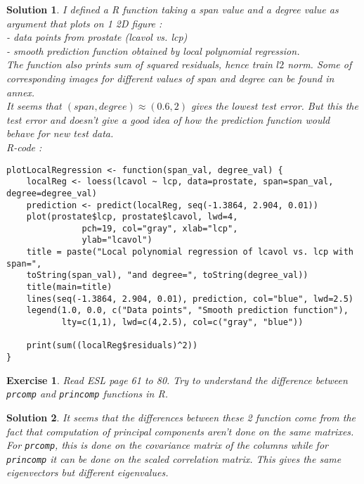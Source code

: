\documentclass[12pt,a4paper]{article}
\newtheorem{exercise}{Exercise}
\newtheorem{solution}{Solution}
\begin{document}
\begin{solution}
I defined a R function taking a span value and a degree value as argument that plots on 1 2D figure : \\
- data points from prostate (lcavol vs. lcp)\\
- smooth prediction function obtained by local polynomial regression. \\

The function also prints sum of squared residuals, hence train $l2$ norm. Some of corresponding images for different values of span and degree can be found in annex. \\

It seems that $(span, degree) \approx (0.6, 2)$ gives the lowest test error. But this the test error and doesn't give a good idea of how the prediction function would behave for new test data. \\
R-code : 
\begin{verbatim}
plotLocalRegression <- function(span_val, degree_val) {
    localReg <- loess(lcavol ~ lcp, data=prostate, span=span_val, degree=degree_val)
    prediction <- predict(localReg, seq(-1.3864, 2.904, 0.01))
    plot(prostate$lcp, prostate$lcavol, lwd=4,
    		   pch=19, col="gray", xlab="lcp",
    		   ylab="lcavol")
    title = paste("Local polynomial regression of lcavol vs. lcp with span=", 
    toString(span_val), "and degree=", toString(degree_val))
    title(main=title)
    lines(seq(-1.3864, 2.904, 0.01), prediction, col="blue", lwd=2.5)
    legend(1.0, 0.0, c("Data points", "Smooth prediction function"), 
           lty=c(1,1), lwd=c(4,2.5), col=c("gray", "blue"))
           
    print(sum((localReg$residuals)^2))
}
\end{verbatim}
\end{solution}

\begin{exercise}
{Read ESL page 61 to 80.} Try to understand the difference between \texttt{prcomp} and \texttt{princomp} functions in R.
\end{exercise}
\begin{solution}
It seems that the differences between these 2 function come from the fact that computation of principal components aren't done on the same matrixes. For \texttt{prcomp}, this is done on the covariance matrix of the columns while for \texttt{princomp} it can be done on the scaled correlation matrix. This gives the same eigenvectors but different eigenvalues.
\end{solution}
\end{document}
